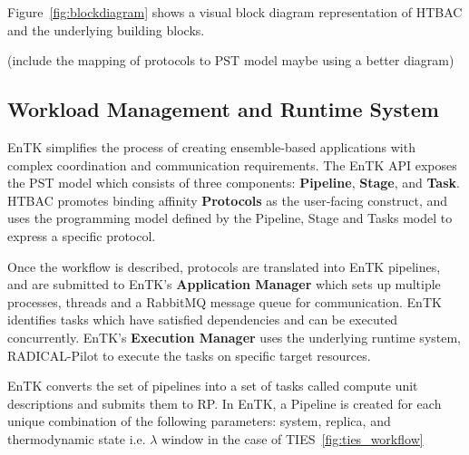Figure~\ref{fig:blockdiagram} shows a visual block diagram representation of 
HTBAC and the underlying building blocks. 

(include the mapping of protocols to PST model maybe using a better diagram) 



\subsection{Workload Management and Runtime System}



EnTK simplifies the process of creating ensemble-based applications with
complex coordination and communication requirements. The EnTK API exposes the
PST model which consists of three components: \textbf{Pipeline},
\textbf{Stage}, and \textbf{Task}. HTBAC promotes binding affinity {\bf
Protocols} as the user-facing construct, and uses the programming model
defined by the Pipeline, Stage and Tasks model to express a specific
protocol. 





Once the workflow is described, protocols are translated into EnTK pipelines, and 
are submitted to EnTK's \textbf{Application Manager} which sets up multiple 
processes, threads and a RabbitMQ message queue for communication.
EnTK identifies tasks which have satisfied dependencies and can be executed
concurrently. EnTK's \textbf{Execution Manager} uses the underlying runtime
system, RADICAL-Pilot to execute the tasks on specific target resources.

EnTK converts the set of pipelines into a set of tasks called compute unit 
descriptions and submits them to RP. In EnTK, a Pipeline is created for 
each unique combination of the following parameters: system, replica, 
and thermodynamic state i.e. $\lambda$ window in the case of 
TIES~\ref{fig:ties_workflow}

